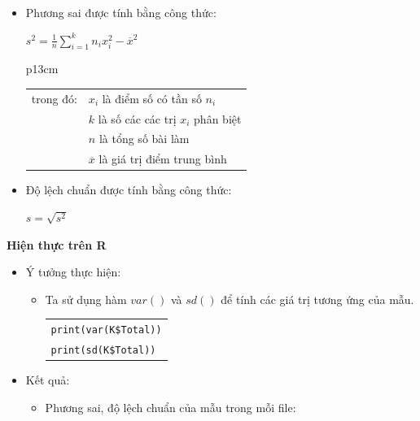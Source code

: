 \documentclass[a4paper]{article}
\theoremstyle{definition}
\begin{document}
\begin{enumerate}[a)]
\begin{itemize}
\begin{itemize}
            \item Phương sai được tính bằng công thức:
            \begin{center}
                $s^2 = \frac{1}{n} \sum \limits_{i=1}^{k} n_i x_i^2 - \overline{x}^2$
                \begin{tabular}{p{13cm}}
                    \begin{tabular}{l l}
                        trong đó: & $x_i$ là điểm số có tần số $n_i$\\
                        & $k$ là số các các trị $x_i$ phân biệt\\
                        & $n$ là tổng số bài làm\\
                        & $\overline{x}$ là giá trị điểm trung bình
                    \end{tabular}
                \end{tabular}
            \end{center}
            \item Độ lệch chuẩn được tính bằng công thức:
            \begin{center}
                $s = \sqrt{s^2}$
            \end{center}
        \end{itemize}
    \end{itemize}
    \bf Hiện thực trên R\normalfont
    \begin{itemize}
        \item Ý tưởng thực hiện:
        \begin{itemize}
            \item Ta sử dụng hàm $var()$ và $sd()$ để tính các giá trị tương ứng của mẫu.
            \begin{center}
                \begin{tabular}{p{13cm}}
                    \texttt{print(var(K\$Total))} \\
                    \texttt{print(sd(K\$Total))}
                \end{tabular}
            \end{center}
        \end{itemize}
        \item Kết quả:
        \begin{itemize}
            \item Phương sai, độ lệch chuẩn của  mẫu trong mỗi file:
            \begin{center}
                \begin{tabular}{l c c}

\end{tabular}
\end{center}
\end{itemize}
\end{itemize}
\end{enumerate}
\end{document}
